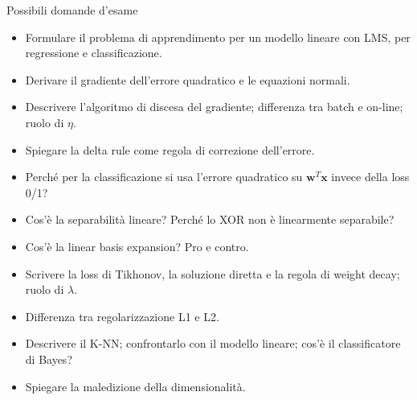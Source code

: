 \begin{boxquestion}{Possibili domande d'esame}

\begin{itemize}
\tightlist
\item
  Formulare il problema di apprendimento per un modello lineare con LMS,
  per regressione e classificazione.
\item
  Derivare il gradiente dell'errore quadratico e le equazioni normali.
\item
  Descrivere l'algoritmo di discesa del gradiente; differenza tra batch
  e on-line; ruolo di \(\eta\).
\item
  Spiegare la delta rule come regola di correzione dell'errore.
\item
  Perché per la classificazione si usa l'errore quadratico su
  \(\mathbf{w}^T\mathbf{x}\) invece della loss 0/1?
\item
  Cos'è la separabilità lineare? Perché lo XOR non è linearmente
  separabile?
\item
  Cos'è la linear basis expansion? Pro e contro.
\item
  Scrivere la loss di Tikhonov, la soluzione diretta e la regola di
  weight decay; ruolo di \(\lambda\).
\item
  Differenza tra regolarizzazione L1 e L2.
\item
  Descrivere il K-NN; confrontarlo con il modello lineare; cos'è il
  classificatore di Bayes?
\item
  Spiegare la maledizione della dimensionalità.
\end{itemize}

\end{boxquestion}
